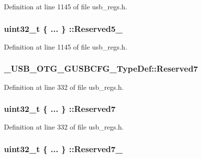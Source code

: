 Definition at line 1145 of file usb\-\_\-regs.\-h.

\hypertarget{group___u_s_b___o_t_g___d_r_i_v_e_r_ga2487ac215286d3d5c2ded2c5d9709730}{
\subsubsection[{Reserved5\-\_\-31}]{\setlength{\rightskip}{0pt plus 5cm}uint32\-\_\-t \{ ... \} \-::Reserved5\-\_}}\label{group___u_s_b___o_t_g___d_r_i_v_e_r_ga2487ac215286d3d5c2ded2c5d9709730}


Definition at line 1145 of file usb\-\_\-regs.\-h.

\hypertarget{group___u_s_b___o_t_g___d_r_i_v_e_r_ga2c2590959125d7af13b63cdc8ade7955}{
\subsubsection[{Reserved7}]{ \-\_\-\-U\-S\-B\-\_\-\-O\-T\-G\-\_\-\-G\-U\-S\-B\-C\-F\-G\-\_\-\-Type\-Def\-::\-Reserved7}}\label{group___u_s_b___o_t_g___d_r_i_v_e_r_ga2c2590959125d7af13b63cdc8ade7955}


Definition at line 332 of file usb\-\_\-regs.\-h.

\hypertarget{group___u_s_b___o_t_g___d_r_i_v_e_r_gacad118ac909a7e4f4c683683fddaff3c}{
\subsubsection[{Reserved7}]{\setlength{\rightskip}{0pt plus 5cm}uint32\-\_\-t \{ ... \} \-::Reserved7}}\label{group___u_s_b___o_t_g___d_r_i_v_e_r_gacad118ac909a7e4f4c683683fddaff3c}


Definition at line 332 of file usb\-\_\-regs.\-h.

\hypertarget{group___u_s_b___o_t_g___d_r_i_v_e_r_ga51ecde92247085b048ce08b209078596}{
\subsubsection[{Reserved7\-\_\-18}]{\setlength{\rightskip}{0pt plus 5cm}uint32\-\_\-t \{ ... \} \-::Reserved7\-\_}}\label{group___u_s_b___o_t_g___d_r_i_v_e_r_ga51ecde92247085b048ce08b209078596}


